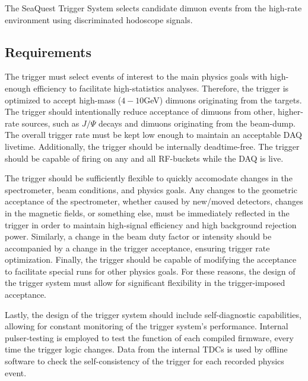 The SeaQuest Trigger System selects candidate dimuon events from the high-rate environment using discriminated hodoscope signals. 

\subsection{Requirements}
The trigger must select events of interest to the main physics goals with high-enough efficiency to facilitate high-statistics analyses.
Therefore, the trigger is optimized to accept high-mass ($4-10$GeV) dimuons originating from the targets.
The trigger should intentionally reduce acceptance of dimuons from other, higher-rate sources, such as $J/\Psi$ decays and dimuons originating from the beam-dump.
The overall trigger rate must be kept low enough to maintain an acceptable DAQ livetime.
Additionally, the trigger should be internally deadtime-free. The trigger should be capable of firing on any and all RF-buckets while the DAQ is live.
\par
The trigger should be sufficiently flexible to quickly accomodate changes in the spectrometer, beam conditions, and physics goals.
Any changes to the geometric acceptance of the spectrometer, whether caused by new/moved detectors, changes in the magnetic fields, or something else, must be immediately reflected in the trigger in order to maintain high-signal efficiency and high background rejection power.
Similarly, a change in the beam duty factor or intensity should be accompanied by a change in the trigger acceptance, ensuring trigger rate optimization.
Finally, the trigger should be capable of modifying the acceptance to facilitate special runs for other physics goals.
For these reasons, the design of the trigger system must allow for significant flexibility in the trigger-imposed acceptance.
\par
Lastly, the design of the trigger system should include self-diagnostic capabilities, allowing for constant monitoring of the trigger system's performance.
Internal pulser-testing is employed to test the function of each compiled firmware, every time the trigger logic changes.
Data from the internal TDCs is used by offline software to check the self-consistency of the trigger for each recorded physics event.


